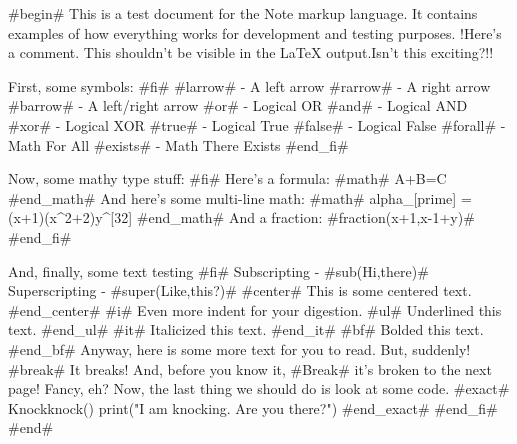 
#begin#
This is a test document for the Note markup language. It contains examples of how everything works for development and testing purposes.
!Here's a comment. This shouldn't be visible in the LaTeX output.Isn't this exciting?!!

First, some symbols:
#fi#
	#larrow# - A left arrow
	#rarrow# - A right arrow
	#barrow# - A left/right arrow
	#or# - Logical OR
	#and# - Logical AND
	#xor# - Logical XOR
	#true# - Logical True
	#false# - Logical False
	#forall# - Math For All
	#exists# - Math There Exists
#end_fi#

Now, some mathy type stuff:
#fi#
	Here's a formula: #math# A+B=C #end_math#
	And here's some multi-line math:
	#math#
		alpha_[prime] = (x+1)(x^2+2)y^[32]
	#end_math#
	And a fraction: #fraction(x+1,x-1+y)#
#end_fi#

And, finally, some text testing
#fi#
	Subscripting - #sub(Hi,there)#
	Superscripting - #super(Like,this?)#
	#center#
	This is some centered text.
	#end_center#
	#i# Even more indent for your digestion.
	#ul#
	Underlined this text.
	#end_ul#
	#it#
	Italicized this text.
	#end_it#
	#bf#
	Bolded this text.
	#end_bf#
	Anyway, here is some more text for you to read. But, suddenly! #break# It breaks! And, before you know it, 
	#Break#
	it's broken to the next page! Fancy, eh?
	Now, the last thing we should do is look at some code.
	#exact#
	Knockknock(){
		print("I am knocking. Are you there?")
	}
	#end_exact#
#end_fi#
#end#
